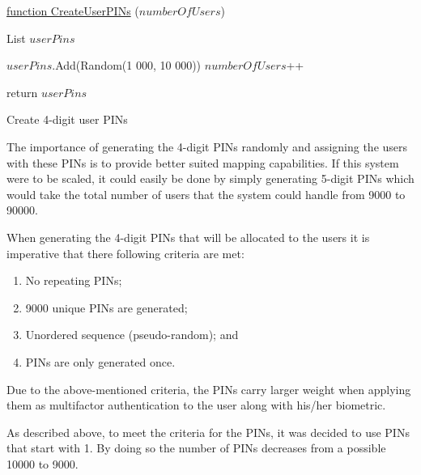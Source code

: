 

\begin{algorithm}
     
     \underline{function CreateUserPINs} ($numberOfUsers$)\;
     
     List $userPins$ \;
     
     {
        $userPins$.Add(Random(1 000, 10 000))\;
        $numberOfUsers$++\;
     }
     
     return $userPins$\;
     \caption{Create 4-digit user PINs}
     \label{alg: Create 4-digit user PINs}
     
\end{algorithm}

The importance of generating the 4-digit PINs randomly and assigning the users with these PINs is to provide better suited mapping capabilities. If this system were to be scaled, it could easily be done by simply generating 5-digit PINs which would take the total number of users that the system could handle from 9000 to 90000.

When generating the 4-digit PINs that will be allocated to the users it is imperative that there following criteria are met:\\

\begin{enumerate}[label=\roman*.]
    \item No repeating PINs;
    \item 9000 unique PINs are generated;
    \item Unordered sequence (pseudo-random); and
    \item PINs are only generated once.
\end{enumerate}





Due to the above-mentioned criteria, the PINs carry larger weight when applying them as multifactor authentication to the user along with his/her biometric. 

As described above, to meet the criteria for the PINs, it was decided to use PINs that start with 1. By doing so the number of PINs decreases from a possible 10000 to 9000. 

